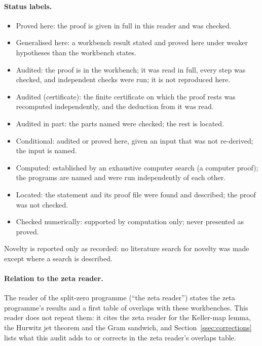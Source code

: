 \paragraph{Status labels.}
\begin{itemize}
\item \textsf{Proved here}: the proof is given in full in this reader and was checked.
\item \textsf{Generalised here}: a workbench result stated and proved here under weaker hypotheses than the workbench states.
\item \textsf{Audited}: the proof is in the workbench; it was read in full, every step was checked, and independent checks were run; it is not reproduced here.
\item \textsf{Audited (certificate)}: the finite certificate on which the proof rests was recomputed independently, and the deduction from it was read.
\item \textsf{Audited in part}: the parts named were checked; the rest is located.
\item \textsf{Conditional}: audited or proved here, given an input that was not re-derived; the input is named.
\item \textsf{Computed}: established by an exhaustive computer search (a computer proof); the programs are named and were run independently of each other.
\item \textsf{Located}: the statement and its proof file were found and described; the proof was not checked.
\item \textsf{Checked numerically}: supported by computation only; never presented as proved.
\end{itemize}
Novelty is reported only as recorded: no literature search for novelty was made except where a search is described.

\paragraph{Relation to the zeta reader.}
The reader of the split-zero programme \cite{ZetaReader} (``the zeta reader'') states the zeta programme's results and a first table of overlaps with these workbenches.
This reader does not repeat them: it cites the zeta reader for the Keller-map lemma, the Hurwitz jet theorem and the Gram sandwich, and Section~\ref{ssec:corrections} lists what this audit adds to or corrects in the zeta reader's overlaps table.
